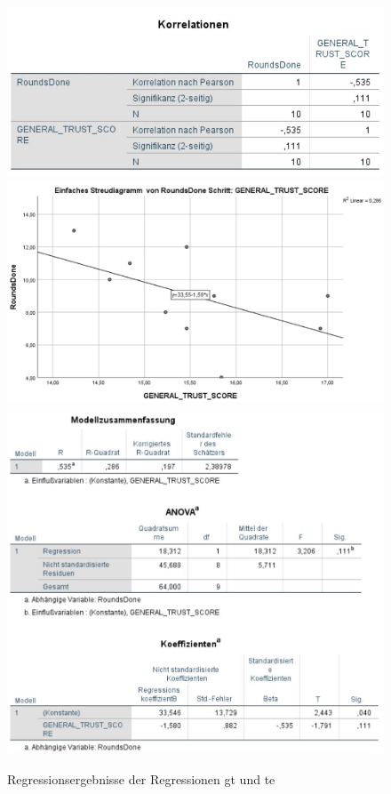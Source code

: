 \documentclass[a4paper,11pt]{article}%
\renewcommand{\\}{\vspace*{0.5\baselineskip} \newline}
\begin{document}
	
\begin{figure}[H]
\centering
		\begin{footnotesize}
			\includegraphics[scale=0.6]{Abbildungen/Post_QuestionnaireStatistiks/h5_both_korrelation}
			\includegraphics[scale=0.6]{Abbildungen/Post_QuestionnaireStatistiks/h5_both_diagramm_korr}
			\includegraphics[scale=0.6]{Abbildungen/Post_QuestionnaireStatistiks/h5_both_regression}
			\caption{Regressionsergebnisse der Regressionen \ac{gt} und \ac{te} }
			\label{fig:h5_both}
		\end{footnotesize}
	\end{figure}	
\end{document}
